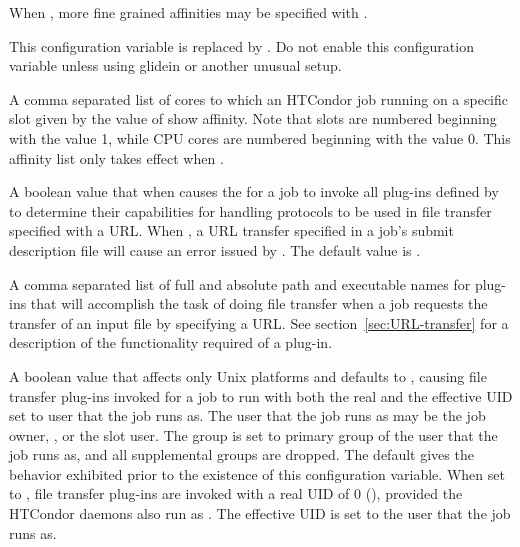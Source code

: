\begin{description}
  When , more fine grained affinities may be specified with
  .

\label{param:SlotNCpuAffinity} 
\item[\Macro{SLOT<N>\_CPU\_AFFINITY}]
  This configuration variable is replaced by .
  Do not enable this configuration variable unless
  using glidein or another unusual setup.

  A comma separated list of cores to which an HTCondor job running on
  a specific slot given by the value of  show affinity.
  Note that slots are numbered beginning with the value 1,
  while CPU cores are numbered beginning with the value 0.
  This affinity list only takes effect when
  .

\label{param:EnableURLTransfers} 
\item[\Macro{ENABLE\_URL\_TRANSFERS}]
  A boolean value that when  causes the  for
  a job to invoke all plug-ins defined by 
  to determine their capabilities for handling protocols to be
  used in file transfer specified with a URL.
  When , a URL transfer specified in a job's submit description
  file will cause an error issued by .
  The default value is .

\label{param:FiletransferPlugins} 
\item[\Macro{FILETRANSFER\_PLUGINS}]
  A comma separated list of full and absolute path and executable names
  for plug-ins that will accomplish the task of doing file transfer
  when a job requests the transfer of an input file by specifying a URL. 
  See section~\ref{sec:URL-transfer} for a description of the functionality
  required of a plug-in.

\label{param:RunFiletransferPluginsWithRoot} 
\item[\Macro{RUN\_FILETRANSFER\_PLUGINS\_WITH\_ROOT}]
  A boolean value that affects only Unix platforms and defaults to ,
  causing file transfer plug-ins invoked for a job to run with both
  the real and the effective UID set to user that the job runs as.
  The user that the job runs as may be the job owner, ,
  or the slot user.
  The group is set to primary group of the user that the job runs as, 
  and all supplemental groups are dropped.
  The default gives the behavior exhibited prior to the existence of
  this configuration variable.
  When set to ,
  file transfer plug-ins are invoked with a real UID of 0 (),
  provided the HTCondor daemons also run as .
  The effective UID is set to the user that the job runs as.


\end{description}
